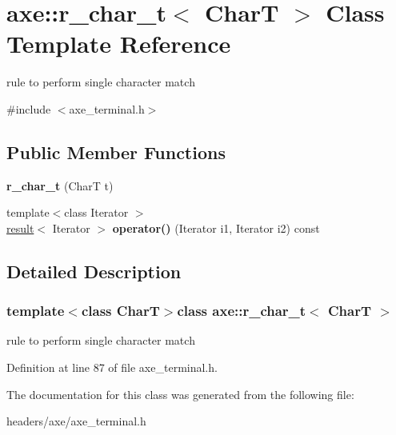 \hypertarget{classaxe_1_1r__char__t}{\section{axe\+:\+:r\+\_\+char\+\_\+t$<$ Char\+T $>$ Class Template Reference}
\label{classaxe_1_1r__char__t}
}


rule to perform single character match  




{\ttfamily \#include $<$axe\+\_\+terminal.\+h$>$}

\subsection*{Public Member Functions}
\begin{DoxyCompactItemize}
\item 
\hypertarget{classaxe_1_1r__char__t_a5fe3e5273d4c663f61e73061944ca10a}{{\bfseries r\+\_\+char\+\_\+t} (Char\+T t)}\label{classaxe_1_1r__char__t_a5fe3e5273d4c663f61e73061944ca10a}

\item 
\hypertarget{classaxe_1_1r__char__t_a71dfaff4a4a3d22b6159a896a16d50e4}{{\footnotesize template$<$class Iterator $>$ }\\\hyperlink{structaxe_1_1result}{result}$<$ Iterator $>$ {\bfseries operator()} (Iterator i1, Iterator i2) const }\label{classaxe_1_1r__char__t_a71dfaff4a4a3d22b6159a896a16d50e4}

\end{DoxyCompactItemize}


\subsection{Detailed Description}
\subsubsection*{template$<$class Char\+T$>$class axe\+::r\+\_\+char\+\_\+t$<$ Char\+T $>$}

rule to perform single character match 

Definition at line 87 of file axe\+\_\+terminal.\+h.



The documentation for this class was generated from the following file\+:\begin{DoxyCompactItemize}
\item 
headers/axe/axe\+\_\+terminal.\+h\end{DoxyCompactItemize}
